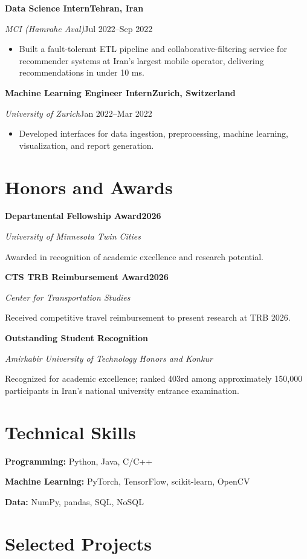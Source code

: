 \documentclass[10pt,letterpaper]{article}
\newcommand{\cvheading}[4]{%
  \needspace{4\baselineskip}%
  \textbf{#1}\hfill\textbf{#2}\par
  \textit{#3}\hfill#4\par
  \vspace{0.15em}%
}
\begin{document}
\cvheading
  {Data Science Intern}
  {Tehran, Iran}
  {MCI (Hamrahe Aval)}
  {Jul 2022--Sep 2022}
\begin{itemize}
  \item Built a fault-tolerant ETL pipeline and collaborative-filtering service for recommender systems at Iran's largest mobile operator, delivering recommendations in under 10 ms.
\end{itemize}

\cvheading
  {Machine Learning Engineer Intern}
  {Zurich, Switzerland}
  {University of Zurich}
  {Jan 2022--Mar 2022}
\begin{itemize}
  \item Developed interfaces for data ingestion, preprocessing, machine learning, visualization, and report generation.
\end{itemize}

\section{Honors and Awards}

\cvheading
  {Departmental Fellowship Award}
  {2026}
  {University of Minnesota Twin Cities}
  {}
Awarded in recognition of academic excellence and research potential.

\vspace{0.35em}
\cvheading
  {CTS TRB Reimbursement Award}
  {2026}
  {Center for Transportation Studies}
  {}
Received competitive travel reimbursement to present research at TRB 2026.

\vspace{0.35em}
\cvheading
  {Outstanding Student Recognition}
  {}
  {Amirkabir University of Technology Honors and Konkur}
  {}
Recognized for academic excellence; ranked 403rd among approximately 150,000 participants in Iran's national university entrance examination.

\section{Technical Skills}

\textbf{Programming:} Python, Java, C/C++\par
\textbf{Machine Learning:} PyTorch, TensorFlow, scikit-learn, OpenCV\par
\textbf{Data:} NumPy, pandas, SQL, NoSQL

\section{Selected Projects}
\end{document}
